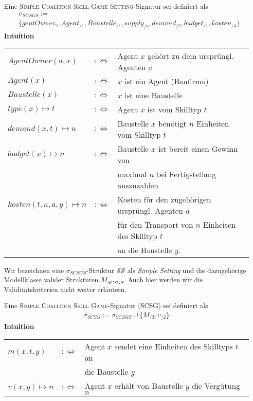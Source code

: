 \begin{definition}[SCSGS]
  Eine \textsc{Simple Coalition Skill Game Setting}-Signatur sei definiert als
  \begin{align*}
    &\sigma_{SCSGS}:= \\
    &\{gentOwner_{2}, Agent_{/1}, Baustelle_{/1}, supply_{/2}, demand_{/2}, budget_{/1}, kosten_{/4} \}
  \end{align*}
  \noindent
  \textbf{Intuition} \\
    \begin{tabular}{lrl}
    $AgentOwner(a, x)$&$:\Leftrightarrow$& Agent $x$ gehört zu dem ursprüngl. Agenten $a$ \\
    $Agent(x)$&$:\Leftrightarrow$& $x$ ist ein Agent (Baufirma) \\
    $Baustelle(x) $&$:\Leftrightarrow$& $x$ ist eine Baustelle \\
    $type(x)\mapsto t $&$:\Leftrightarrow$& Agent $x$ ist vom Skilltyp $t$ \\
    $demand(x, t)\mapsto n $&$:\Leftrightarrow$& Baustelle $x$ benötigt $n$ Einheiten vom Skilltyp $t$ \\
    $budget(x)\mapsto n $&$:\Leftrightarrow$&
    Baustelle $x$ ist bereit einen Gewinn von \\&&maximal $n$ bei Fertigstellung auszuzahlen\\
    $kosten(t, n, a, y)\mapsto n$&$:\Leftrightarrow$& Kosten für den zugehörigen ursprüngl. Agenten $a$ \\&& für den Transport von $n$ Einheiten des Skilltyp $t$ \\&& an die Baustelle $y$.
    \end{tabular}
\end{definition}

\noindent
Wir bezeichnen eine $\sigma_{SCSGS}$-Struktur $\mathcal{SS}$ als \textit{Simple Setting} und die dazugehörige Modellklasse valider Strukturen $M_{SCSGS}$. Auch hier werden wir die Validitätskriterien nicht weiter erläutern.

\begin{definition}[SCSG]
  Eine \textsc{Simple Coalition Skill Game}-Signatur (SCSG) sei definiert als
  \begin{align*}
    \sigma_{SCSG}:=\sigma_{SCSGS}\cup\{M_{/3}, v_{/2}\}
  \end{align*}
  \noindent
  \textbf{Intuition} \\
    \begin{tabular}{lrl}
    $m(x, t, y)$&$:\Leftrightarrow$& Agent $x$ sendet eine Einheiten des Skilltyps $t$ an \\&&die Baustelle $y$ \\
    $v(x,y)\mapsto n$&$:\Leftrightarrow$& Agent $x$ erhält von Baustelle $y$ die Vergütung $n$
    \end{tabular}
\end{definition}

